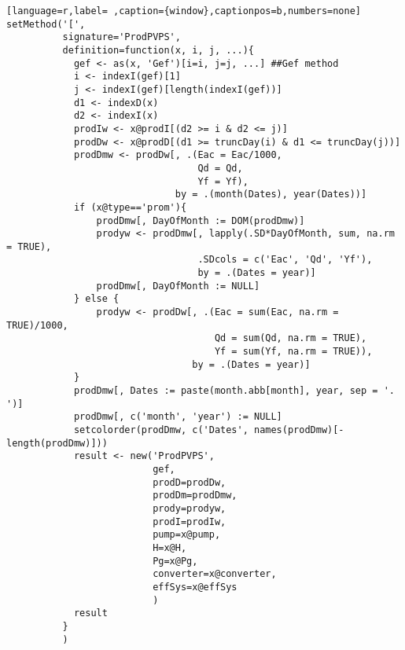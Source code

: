 \begin{lstlisting}[language=r,label= ,caption={window},captionpos=b,numbers=none]
setMethod('[',
          signature='ProdPVPS',
          definition=function(x, i, j, ...){
            gef <- as(x, 'Gef')[i=i, j=j, ...] ##Gef method
            i <- indexI(gef)[1]
            j <- indexI(gef)[length(indexI(gef))]
            d1 <- indexD(x)
            d2 <- indexI(x)
            prodIw <- x@prodI[(d2 >= i & d2 <= j)]
            prodDw <- x@prodD[(d1 >= truncDay(i) & d1 <= truncDay(j))]
            prodDmw <- prodDw[, .(Eac = Eac/1000,
                                  Qd = Qd,
                                  Yf = Yf),
                              by = .(month(Dates), year(Dates))]
            if (x@type=='prom'){
                prodDmw[, DayOfMonth := DOM(prodDmw)]
                prodyw <- prodDmw[, lapply(.SD*DayOfMonth, sum, na.rm = TRUE),
                                  .SDcols = c('Eac', 'Qd', 'Yf'),
                                  by = .(Dates = year)]
                prodDmw[, DayOfMonth := NULL]
            } else {
                prodyw <- prodDw[, .(Eac = sum(Eac, na.rm = TRUE)/1000,
                                     Qd = sum(Qd, na.rm = TRUE),
                                     Yf = sum(Yf, na.rm = TRUE)),
                                 by = .(Dates = year)]
            }
            prodDmw[, Dates := paste(month.abb[month], year, sep = '. ')]
            prodDmw[, c('month', 'year') := NULL]
            setcolorder(prodDmw, c('Dates', names(prodDmw)[-length(prodDmw)]))
            result <- new('ProdPVPS',
                          gef,
                          prodD=prodDw,
                          prodDm=prodDmw,
                          prody=prodyw,
                          prodI=prodIw,
                          pump=x@pump,
                          H=x@H,
                          Pg=x@Pg,
                          converter=x@converter,
                          effSys=x@effSys
                          )
            result
          }
          )
\end{lstlisting}
